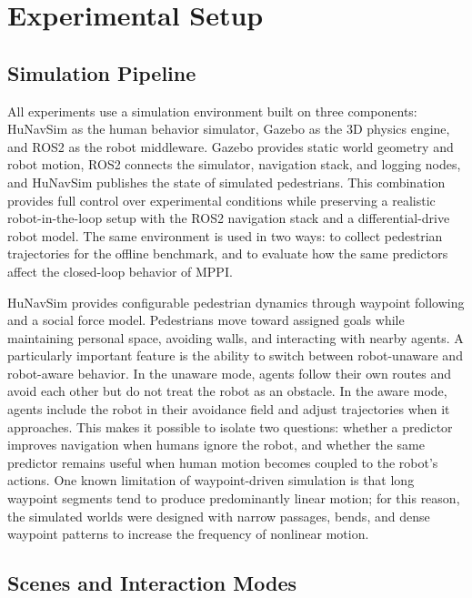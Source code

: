 \documentclass[12pt, a4paper]{article}
\begin{document}
\section{Experimental Setup}
\label{sec:setup}

\subsection{Simulation Pipeline}

All experiments use a simulation environment built on three components: HuNavSim as the human behavior simulator, Gazebo as the 3D physics engine, and ROS2 as the robot middleware. Gazebo provides static world geometry and robot motion, ROS2 connects the simulator, navigation stack, and logging nodes, and HuNavSim publishes the state of simulated pedestrians. This combination provides full control over experimental conditions while preserving a realistic robot-in-the-loop setup with the ROS2 navigation stack and a differential-drive robot model. The same environment is used in two ways: to collect pedestrian trajectories for the offline benchmark, and to evaluate how the same predictors affect the closed-loop behavior of MPPI.

HuNavSim provides configurable pedestrian dynamics through waypoint following and a social force model. Pedestrians move toward assigned goals while maintaining personal space, avoiding walls, and interacting with nearby agents. A particularly important feature is the ability to switch between robot-unaware and robot-aware behavior. In the unaware mode, agents follow their own routes and avoid each other but do not treat the robot as an obstacle. In the aware mode, agents include the robot in their avoidance field and adjust trajectories when it approaches. This makes it possible to isolate two questions: whether a predictor improves navigation when humans ignore the robot, and whether the same predictor remains useful when human motion becomes coupled to the robot's actions. One known limitation of waypoint-driven simulation is that long waypoint segments tend to produce predominantly linear motion; for this reason, the simulated worlds were designed with narrow passages, bends, and dense waypoint patterns to increase the frequency of nonlinear motion.

\subsection{Scenes and Interaction Modes}
\end{document}
